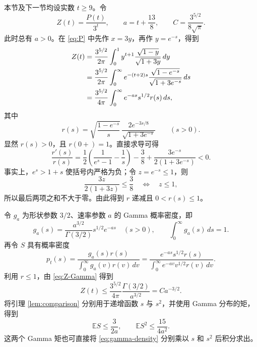 \documentclass[UTF8,fontset=fandol,11pt]{ctexart}
\newcommand{\E}{\mathbb{E}}
\begin{document}
本节及下一节均设实数 $t\ge9$。令
\begin{equation}\label{eq:ZaC}
Z(t)=\frac{P(t)}{3^t},
\qquad
a=t+\frac{13}{8},
\qquad
C=\frac{3^{5/2}}{8\sqrt\pi}.
\end{equation}
此时总有 $a>0$。在 \eqref{eq:P} 中先作 $x=3y$，再作 $y=e^{-s}$，得到
\begin{align}
Z(t)
&=\frac{3^{5/2}}{2\pi}\int_0^1
y^{t+1}\frac{\sqrt{1-y}}{\sqrt{1+3y}}\,dy\notag\\
&=\frac{3^{5/2}}{2\pi}\int_0^\infty
e^{-(t+2)s}\frac{\sqrt{1-e^{-s}}}{\sqrt{1+3e^{-s}}}\,ds\notag\\
&=\frac{3^{5/2}}{4\pi}\int_0^\infty
e^{-as}s^{1/2}r(s)\,ds, \label{eq:Z-Gamma}
\end{align}
其中
\begin{equation}\label{eq:r}
r(s)=\sqrt{\frac{1-e^{-s}}s}\,
\frac{2e^{-3s/8}}{\sqrt{1+3e^{-s}}}
\qquad(s>0).
\end{equation}
显然 $r(s)>0$，且 $r(0+)=1$。直接求导可得
\begin{equation}\label{eq:r-derivative}
\frac{r'(s)}{r(s)}
=\frac12\left(\frac1{e^s-1}-\frac1s\right)
-\frac38+\frac{3e^{-s}}{2(1+3e^{-s})}<0.
\end{equation}
事实上，$e^s>1+s$ 使括号内严格为负；令 $z=e^{-s}\le1$，则
\[
\frac{3z}{2(1+3z)}\le\frac38
\quad\Longleftrightarrow\quad z\le1,
\]
所以最后两项之和不大于零。由此得到 $r$ 递减且 $0<r(s)\le1$。

令 $g_a$ 为形状参数 $3/2$、速率参数 $a$ 的 Gamma 概率密度，即
\begin{equation}\label{eq:gamma-density}
g_a(s)=\frac{a^{3/2}}{\Gamma(3/2)}s^{1/2}e^{-as}
\quad(s>0),
\qquad
\int_0^\infty g_a(s)\,ds=1.
\end{equation}
再令 $S$ 具有概率密度
\begin{equation}\label{eq:S-density}
p_t(s)=\frac{g_a(s)r(s)}{\displaystyle\int_0^\infty g_a(v)r(v)\,dv}
=\frac{e^{-as}s^{1/2}r(s)}{\displaystyle\int_0^\infty e^{-av}v^{1/2}r(v)\,dv}.
\end{equation}
利用 $r\le1$，由 \eqref{eq:Z-Gamma} 得到
\begin{equation}\label{eq:Z-upper}
Z(t)\le\frac{3^{5/2}}{4\pi}\frac{\Gamma(3/2)}{a^{3/2}}
=C a^{-3/2}.
\end{equation}
将引理 \ref{lem:comparison} 分别用于递增函数 $s$ 与 $s^2$，并使用 Gamma 分布的矩，得到
\begin{equation}\label{eq:S-moments}
\E S\le\frac3{2a},
\qquad
\E S^2\le\frac{15}{4a^2}.
\end{equation}
这两个 Gamma 矩也可直接将 \eqref{eq:gamma-density} 分别乘以 $s$ 和 $s^2$ 后积分求出。
\end{document}
